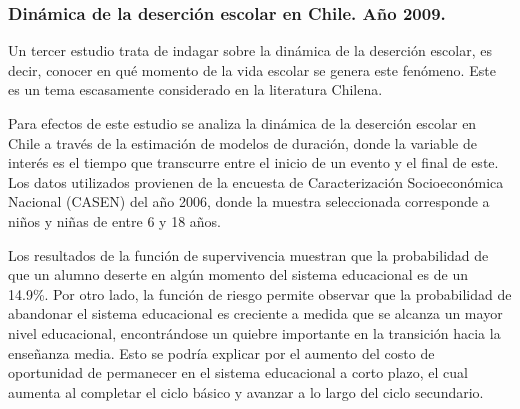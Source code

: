 \subsubsection{Dinámica de la deserción escolar en Chile. Año 2009.}
Un tercer estudio trata de indagar  sobre la dinámica de la deserción escolar, es decir, conocer en qué momento de la vida escolar se genera este fenómeno. Este es un tema escasamente considerado en la literatura Chilena. 

Para efectos de este estudio se analiza la dinámica de la deserción escolar en Chile a través de la estimación de modelos de duración, donde la variable de interés es el tiempo que transcurre entre el inicio de un evento y el final de este. Los datos utilizados provienen de la encuesta de Caracterización Socioeconómica Nacional (CASEN) del año 2006, donde la muestra seleccionada corresponde a niños y niñas de entre 6 y 18 años.

Los resultados de la función de supervivencia muestran que la probabilidad de que un alumno deserte en algún momento del sistema educacional es de un 14.9\%. Por otro lado, la función de riesgo permite observar que la probabilidad de abandonar el sistema educacional es creciente a medida que se alcanza un mayor nivel educacional, encontrándose un quiebre importante en la transición hacia la enseñanza media. Esto se podría explicar por el aumento del costo de oportunidad de permanecer en el sistema educacional a corto plazo, el cual aumenta al completar el ciclo básico y avanzar a lo largo del ciclo secundario. 

